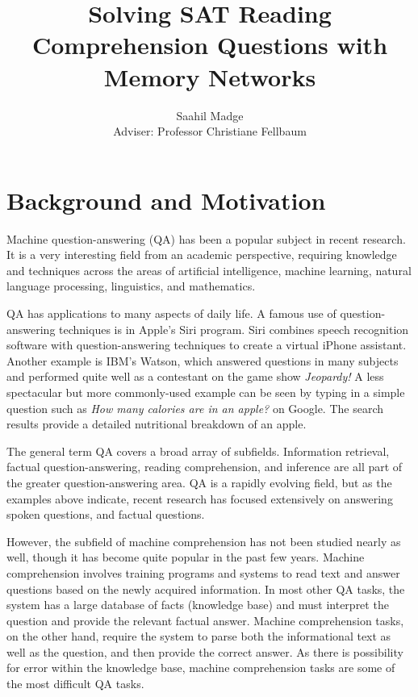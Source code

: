 \documentclass[pageno]{jpaper}
\begin{document}
\title{
Solving SAT Reading Comprehension Questions with Memory Networks}

\author{Saahil Madge\\Adviser: Professor Christiane Fellbaum}

\date{}
\maketitle

\thispagestyle{empty}
\doublespacing

\section{Background and Motivation}
\label{Background and Motivation}

Machine question-answering (QA) has been a popular subject in recent research.
It is a very interesting field from an academic perspective, requiring
knowledge and techniques across the areas of artificial intelligence, machine
learning, natural language processing, linguistics, and mathematics.

QA has applications to many aspects of daily life. A famous use of
question-answering techniques is in Apple's Siri program. Siri combines speech
recognition software with question-answering techniques to create a virtual
iPhone assistant. Another example is IBM's Watson, which answered questions in
many subjects and performed quite well as a contestant on the game show
\textit{Jeopardy!} A less spectacular but more commonly-used example can be seen
by typing in a simple question such as \textit{How many calories are in an
apple?} on Google. The search results provide a detailed nutritional breakdown
of an apple.

The general term QA covers a broad array of subfields. Information retrieval,
factual question-answering, reading comprehension, and inference are all part
of the greater question-answering area. QA is a rapidly evolving field, but as
the examples above indicate, recent research has focused extensively on
answering spoken questions, and factual questions.

However, the subfield of machine comprehension has not been studied nearly as
well, though it has become quite popular in the past few years. Machine
comprehension involves training programs and systems to read text and answer
questions based on the newly acquired information. In most other QA tasks, the
system has a large database of facts (knowledge base) and must interpret the
question and provide the relevant factual answer. Machine comprehension tasks,
on the other hand, require the system to parse both the informational text as
well as the question, and then provide the correct answer. As there is
possibility for error within the knowledge base, machine comprehension tasks
are some of the most difficult QA tasks.
\end{document}
